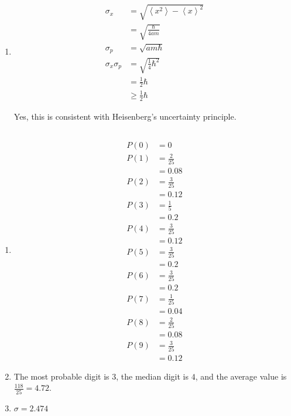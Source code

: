 \documentclass{article}
\newcommand{\ev}[1]{\left< #1 \right>}
\begin{document}
\begin{enumerate}
  \item

        \begin{align*}
          \sigma_x          & = \sqrt{\ev{x^2} - \ev{x}^2} \\
                            & = \sqrt{\frac{\hbar}{4 a m}} \\
          \sigma_p          & = \sqrt{a m \hbar}           \\
          \sigma_x \sigma_p & = \sqrt{\frac{1}{4} \hbar^2} \\
                            & = \frac{1}{2} \hbar          \\
                            & \ge \frac{1}{2} \hbar
        \end{align*}

        Yes, this is consistent with Heisenberg's uncertainty principle.
\end{enumerate}

\subsection{}

\begin{enumerate}
  \item

        \begin{align*}
          P(0) & = 0            \\
          P(1) & = \frac{2}{25} \\
               & = 0.08         \\
          P(2) & = \frac{3}{25} \\
               & = 0.12         \\
          P(3) & = \frac{1}{5}  \\
               & = 0.2          \\
          P(4) & = \frac{3}{25} \\
               & = 0.12         \\
          P(5) & = \frac{3}{25} \\
               & = 0.2          \\
          P(6) & = \frac{3}{25} \\
               & = 0.2          \\
          P(7) & = \frac{1}{25} \\
               & = 0.04         \\
          P(8) & = \frac{2}{25} \\
               & = 0.08         \\
          P(9) & = \frac{3}{25} \\
               & = 0.12
        \end{align*}

  \item The most probable digit is $3$, the median digit is $4$, and the average value is $\frac{118}{25} = 4.72$.

  \item $\sigma = 2.474$
\end{enumerate}
\end{document}
